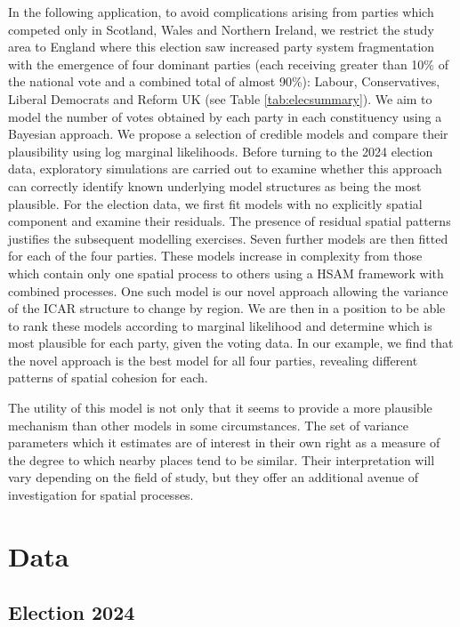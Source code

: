\documentclass[webpdf,large,contemporary,namedate]{oup-authoring-template}
\theoremstyle{thmstyleone}
\theoremstyle{thmstyletwo}
\theoremstyle{thmstylethree}
\begin{document}
In the following application, to avoid complications arising from
parties which competed only in Scotland, Wales and Northern Ireland, we
restrict the study area to England where this election saw increased
party system fragmentation \citep{Prosser2024} with the emergence of
four dominant parties (each receiving greater than 10\% of the national
vote and a combined total of almost 90\%): Labour, Conservatives,
Liberal Democrats and Reform UK (see Table \ref{tab:elecsummary}). We
aim to model the number of votes obtained by each party in each
constituency using a Bayesian approach. We propose a selection of
credible models and compare their plausibility using log marginal
likelihoods. Before turning to the 2024 election data, exploratory
simulations are carried out to examine whether this approach can
correctly identify known underlying model structures as being the most
plausible. For the election data, we first fit models with no explicitly
spatial component and examine their residuals. The presence of residual
spatial patterns justifies the subsequent modelling exercises. Seven
further models are then fitted for each of the four parties. These
models increase in complexity from those which contain only one spatial
process to others using a HSAM framework with combined processes. One
such model is our novel approach allowing the variance of the ICAR
structure to change by region. We are then in a position to be able to
rank these models according to marginal likelihood and determine which
is most plausible for each party, given the voting data. In our example,
we find that the novel approach is the best model for all four parties,
revealing different patterns of spatial cohesion for each.

The utility of this model is not only that it seems to provide a more
plausible mechanism than other models in some circumstances. The set of
variance parameters which it estimates are of interest in their own
right as a measure of the degree to which nearby places tend to be
similar. Their interpretation will vary depending on the field of study,
but they offer an additional avenue of investigation for spatial
processes.

\section{Data}\label{data}

\subsection{Election 2024}\label{election-2024}
\end{document}
